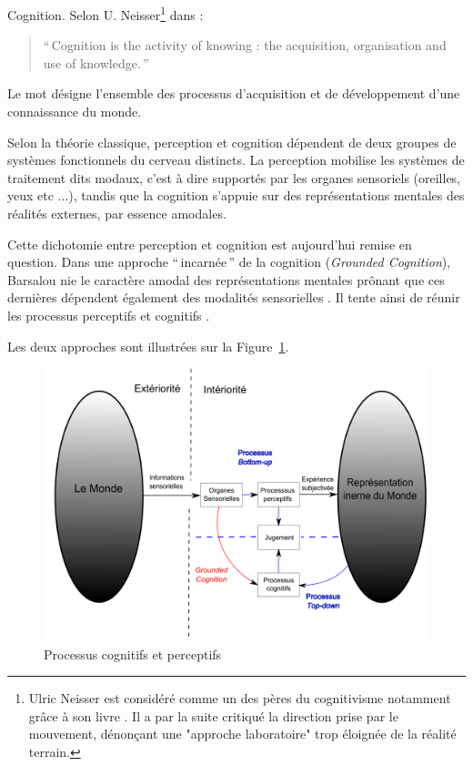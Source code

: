 Cognition. Selon U. Neisser\footnote{Ulric Neisser est considéré comme un des pères du cognitivisme notamment grâce à son livre \citep{neisser1967cognitive}. Il a par la suite critiqué la direction prise par le mouvement, dénonçant une "approche laboratoire" trop éloignée de la réalité terrain.} dans \citep[p. ??]{neisser1976cognition}:

\begin{quote}
``\,Cognition is the activity of knowing : the acquisition, organisation and use of knowledge.\,''
\end{quote}

Le mot désigne l'ensemble des processus d'acquisition et de développement d'une connaissance du monde. 

Selon la théorie classique, perception et cognition dépendent de deux groupes de systèmes fonctionnels du cerveau distincts. La perception mobilise les systèmes de traitement dits modaux, c'est à dire supportés par les organes sensoriels (oreilles, yeux etc $\ldots$), tandis que la cognition s'appuie sur des représentations mentales des réalités externes, par essence amodales.
 
Cette dichotomie entre perception et cognition est aujourd'hui remise en question. Dans une approche ``\,incarnée\,'' de la cognition (\emph{Grounded Cognition}), Barsalou nie le caractère amodal des représentations mentales prônant que ces dernières dépendent également des modalités sensorielles \citep{barsalou2010grounded}. Il tente ainsi de réunir les processus perceptifs et cognitifs \citep{goldstone1998reuniting, barsalou1999perceptions}.

Les deux approches sont illustrées sur la Figure~\ref{fig:processusPercepAndCo}.

\begin{figure}[t]
        \myfloatalign
        \includegraphics[width=.8\linewidth]{gfx/Representation}
        \caption{Processus cognitifs et perceptifs}\label{fig:processusPercepAndCo}
\end{figure}

